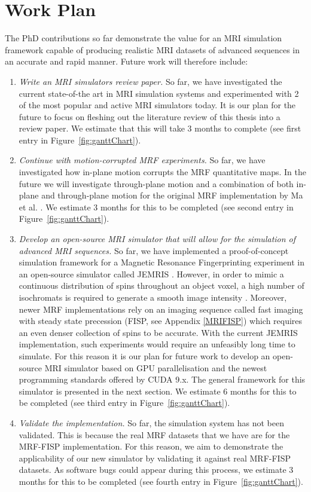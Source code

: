 \section{Work Plan}\label{chapterlabel4sec2}

The PhD contributions so far demonstrate the value for an MRI simulation framework capable of producing realistic MRI datasets of advanced sequences in an accurate and rapid manner.
Future work will therefore include:

\begin{enumerate}
    \item \textit{Write an MRI simulators review paper.}
    So far, we have investigated the current state-of-the art in MRI simulation systems and experimented with 2 of the most popular and active MRI simulators today.
    It is our plan for the future to focus on fleshing out the literature review of this thesis into a review paper.
    We estimate that this will take 3 months to complete (see first entry in Figure~\ref{fig:ganttChart}). 

	\item \textit{Continue with motion-corrupted MRF experiments.}
	So far, we have investigated how in-plane motion corrupts the MRF quantitative maps.
	In the future we will investigate through-plane motion and a combination of both in-plane and through-plane motion for the original MRF implementation by Ma et al. \cite{Ma2013}.
	We estimate 3 months for this to be completed (see second entry in Figure~\ref{fig:ganttChart}).
	
	\item \textit{Develop an open-source MRI simulator that will allow for the simulation of advanced MRI sequences.}
	So far, we have implemented a proof-of-concept simulation framework for a Magnetic Resonance Fingerprinting experiment in an open-source simulator called JEMRIS \cite{Stocker2010}.
	However, in order to mimic a continuous distribution of spins throughout an object voxel, a high number of isochromats is required to generate a smooth image intensity \cite{Shkarin1997}.
	Moreover, newer MRF implementations rely on an imaging sequence called fast imaging with steady state precession (FISP, see Appendix \ref{MRIFISP}) which requires an even denser collection of spins to be accurate.
	With the current JEMRIS implementation, such experiments would require an unfeasibly long time to simulate.
	For this reason it is our plan for future work to develop an open-source MRI simulator based on GPU parallelisation and the newest programming standards offered by CUDA 9.x.
	The general framework for this simulator is presented in the next section.
	We estimate 6 months for this to be completed (see third entry in Figure~\ref{fig:ganttChart}). 
	\item \textit{Validate the implementation.}
	So far, the simulation system has not been validated.
	This is because the real MRF datasets that we have are for the MRF-FISP implementation.
	For this reason, we aim to demonstrate the applicability of our new simulator by validating it against real MRF-FISP datasets.
	As software bugs could appear during this process, we estimate 3 months for this to be completed (see fourth entry in Figure~\ref{fig:ganttChart}).
	

\end{enumerate}
